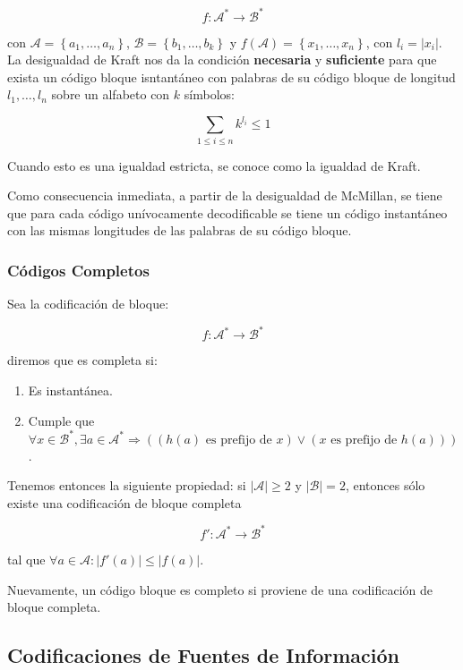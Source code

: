 \[
f:\mathcal{A}^*\rightarrow\mathcal{B}^*
\]

con \(\mathcal{A}=\left\{a_1,\dots,a_n\right\}\),
\(\mathcal{B}=\left\{b_1,\dots,b_k\right\}\) y
\(f\left(\mathcal{A}\right)=\left\{x_1,\dots,x_n\right\}\), con
\(l_i = \left|x_i\right|\). La desigualdad de Kraft nos da la condición
\textbf{necesaria} y \textbf{suficiente} para que exista un código
bloque isntantáneo con palabras de su código bloque de longitud
\(l_1,\dots,l_n\) sobre un alfabeto con \(k\) símbolos:

\[
\sum_{1\leq i\leq n}k^{l_i}\leq 1
\]

Cuando esto es una igualdad estricta, se conoce como la igualdad de
Kraft.

Como consecuencia inmediata, a partir de la desigualdad de McMillan, se
tiene que para cada código unívocamente decodificable se tiene un código
instantáneo con las mismas longitudes de las palabras de su código
bloque.

\subsubsection{Códigos Completos}\label{cuxf3digos-completos}

Sea la codificación de bloque:

\[
f:\mathcal{A}^*\rightarrow\mathcal{B}^*
\]

diremos que es completa si:

\begin{enumerate}
\def\labelenumi{\arabic{enumi}.}
\tightlist
\item
  Es instantánea.
\item
  Cumple que
  \(\forall x\in\mathcal{B}^*,\exists a\in\mathcal{A}^*\Rightarrow\left(\left(h(a)\text{ es prefijo de }x\right)\vee\left(x\text{ es prefijo de }h(a)\right)\right)\).
\end{enumerate}

Tenemos entonces la siguiente propiedad: si
\(\left|\mathcal{A}\right|\geq 2\) y \(\left|\mathcal{B}\right|=2\),
entonces sólo existe una codificación de bloque completa

\[
f':\mathcal{A}^*\rightarrow\mathcal{B}^*
\]

tal que
\(\forall a\in\mathcal{A}:\left|f'(a)\right|\leq\left|f(a)\right|\).

Nuevamente, un código bloque es completo si proviene de una codificación
de bloque completa.

\subsection{Codificaciones de Fuentes de
Información}\label{codificaciones-de-fuentes-de-informaciuxf3n}

